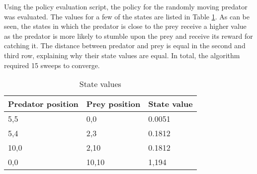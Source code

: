 Using the policy evaluation script, the policy for the randomly moving predator was evaluated. The values for a few of the states are listed in Table \ref{tab-poleval}. As can be seen, the states in which the predator is close to the prey receive a higher value as the predator is more likely to stumble upon the prey and receive its reward for catching it. The distance between predator and prey is equal in the second and third row, explaining why their state values are equal. In total, the algorithm required 15 sweeps to converge. \\

\begin{table}
\begin{center}
  \begin{tabular}{l | l | l}
     Predator position & Prey position & State value \\
    \hline
    5,5 & 0,0 & 0.0051 \\
    5,4 & 2,3 & 0.1812 \\
    10,0 & 2,10 & 0.1812 \\
    0,0 & 10,10 & 1,194
  \end{tabular}
  \caption{State values}
  \label{tab-poleval}
\end{center}
\end{table}